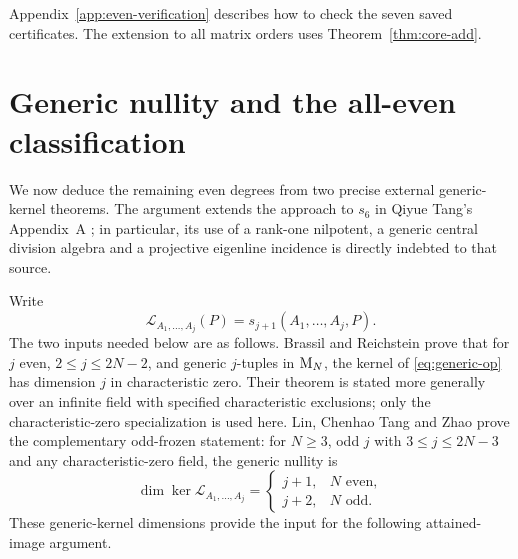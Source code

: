 Appendix~\ref{app:even-verification} describes how to check the
seven saved certificates. The extension to all matrix orders
uses Theorem~\ref{thm:core-add}.

\section{Generic nullity and the all-even classification}\label{sec:even-general}
We now deduce the remaining even degrees from two precise
external generic-kernel theorems. The argument extends the
approach to $s_6$ in Qiyue Tang's Appendix~A
\cite[Proposition~11]{Tang2026FiveSix}; in particular,
its use of a rank-one nilpotent, a generic central division
algebra and a projective eigenline incidence is directly indebted
to that source.

Write
\begin{equation}\label{eq:generic-op}
 \mathcal L_{A_1,\ldots,A_j}(P)
 =s_{j+1}(A_1,\ldots,A_j,P).
\end{equation}
The two inputs needed below are as follows. Brassil and
Reichstein \cite[Theorem~1.2]{BrassilReichstein2022} prove that
for $j$ even, $2\le j\le2N-2$, and generic $j$-tuples in
$\mathrm{M}_N$, the kernel of \eqref{eq:generic-op} has dimension
$j$ in characteristic zero. Their theorem is stated more
generally over an infinite field with specified characteristic
exclusions; only the characteristic-zero specialization is
used here. Lin, Chenhao Tang and Zhao
\cite[Theorem~1.2 and Remark~6.1]{LinTangZhao2026}
prove the complementary odd-frozen statement: for $N\ge3$,
odd $j$ with $3\le j\le2N-3$ and any characteristic-zero
field, the generic nullity is
\begin{equation}\label{eq:GN}
 \dim\ker\mathcal L_{A_1,\ldots,A_j}
 =\begin{cases}j+1,&N\text{ even},\\
 j+2,&N\text{ odd}.\end{cases}
\end{equation}
These generic-kernel dimensions provide the input for the
following attained-image argument.

